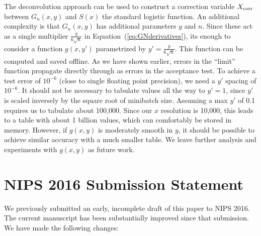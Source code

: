 \documentclass[twoside]{article} \usepackage{aistats2017}
\begin{document}
The deconvolution approach can be used to construct a correction variable
$X_{\rm corr}$ between $G_n(x,y)$ and $S(x)$ the standard logistic function. An
additional complexity is that $G_n(x,y)$ has additional parameters $y$ and $n$.
Since these act as a single multiplier $\frac{y}{6\sqrt{n}}$ in
Equation~(\ref{eq:GNderivatives}), its enough to consider a function $g(x,y')$
parametrized by $y'= \frac{y}{6\sqrt{n}}$. This function can be computed and
saved offline. As we have shown earlier, errors in the ``limit'' function
propagate directly through as errors in the acceptance test.  To achieve a test
error of $10^{-6}$ (close to single floating point precision), we need a $y'$
spacing of $10^{-6}$. It should not be necessary to tabulate values all the way to
$y'=1$, since $y'$ is scaled inversely by the square root of minibatch size.
Assuming a max $y'$ of 0.1 requires us to tabulate about 100,000.  Since our $x$
resolution is 10,000, this leads to a table with about 1 billion values, which
can comfortably be stored in memory.  However, if $g(x,y)$ is moderately smooth
in $y$, it should be possible to achieve similar accuracy with a much smaller
table. We leave further analysis and experiments with $g(x,y)$ as future work.




\clearpage
\section{NIPS 2016 Submission Statement}

We previously submitted an early, incomplete draft of this paper to NIPS 2016. The
current manuscript has been substantially improved since that submission. We have
made the following changes:
\end{document}
